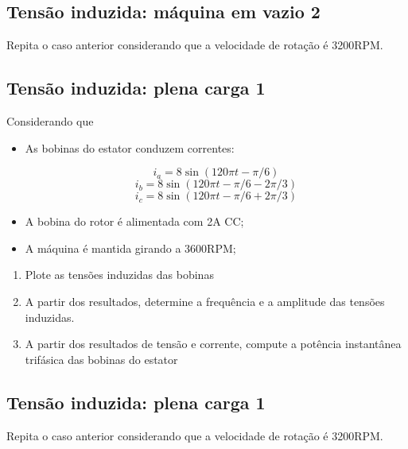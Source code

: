 \documentclass[a4paper]{article}
\theoremstyle{definition}
\theoremstyle{plain}
\begin{document}
\subsection{Tensão induzida: máquina em vazio 2}

Repita o caso anterior considerando que a velocidade de rotação é 3200RPM.


\subsection{Tensão induzida: plena carga 1}

Considerando que

\begin{itemize}
\item As bobinas do estator conduzem correntes:
	
	\begin{equation}
		i_a = 8 \sin(120\pi t - \pi/6)
	\end{equation}
	\begin{equation}
		i_b = 8 \sin(120\pi t - \pi/6 - 2\pi/3)
	\end{equation}
	\begin{equation}
		i_c = 8 \sin(120\pi t - \pi/6 + 2\pi/3)
	\end{equation}

\item A bobina do rotor é alimentada com 2A CC;
\item A máquina é mantida girando a 3600RPM;
\end{itemize}




\begin{enumerate}
\item Plote as tensões induzidas das bobinas
\item A partir dos resultados, determine a frequência e a amplitude das tensões induzidas.
\item A partir dos resultados de tensão e corrente, compute a potência instantânea trifásica das bobinas do estator
\end{enumerate}


\subsection{Tensão induzida: plena carga 1}

Repita o caso anterior considerando que a velocidade de rotação é 3200RPM.
\end{document}
